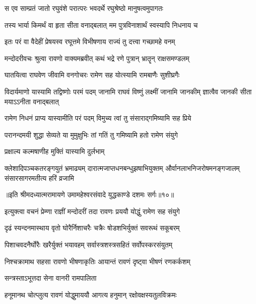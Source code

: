 \twolineshloka
{स एव साम्प्रतं जातो रघुवंशे परात्परः}
{भवदर्थे रघुश्रेष्ठो मानुषत्वमुपागतः} %

\twolineshloka
{तस्य भार्या किमर्थं वा हृता सीता वनाद्बलात्}
{मम पुत्रविनाशार्थं स्वस्यापि निधनाय च} %

\twolineshloka
{इतः परं वा वैदेहीं प्रेषयस्व रघूत्तमे}
{विभीषणाय राज्यं तु दत्त्वा गच्छामहे वनम्} %

\twolineshloka
{मन्दोदरीवचः श्रुत्वा रावणो वाक्यमब्रवीत्}
{कथं भद्रे रणे पुत्रान् भ्रातॄन् राक्षसमण्डलम्} %

\twolineshloka
{घातयित्वा राघवेण जीवामि वनगोचरः}
{रामेण सह योत्स्यामि रामबाणैः सुशीघ्रगैः} %

\threelineshloka
{विदार्यमाणो यास्यामि तद्विष्णोः परमं पदम्}
{जानामि राघवं विष्णुं लक्ष्मीं जानामि जानकीम्}
{ज्ञात्वैव जानकी सीता मयाऽऽनीता वनाद्बलात्} %

\twolineshloka
{रामेण निधनं प्राप्य यास्यामीति परं पदम्}
{विमुच्य त्वां तु संसाराद्गमिष्यामि सह प्रिये} %

\twolineshloka
{परानन्दमयी शुद्धा सेव्यते या मुमुक्षुभिः}
{तां गतिं तु गमिष्यामि हतो रामेण संयुगे} %

\onelineshloka
{प्रक्षाल्य कल्मषाणीह मुक्तिं यास्यामि दुर्लभाम्} %

\fourlineindentedshloka
{क्लेशादिपञ्चकतरङ्गयुतं भ्रमाढ्यम्}
{दारात्मजाप्तधनबन्धुझषाभियुक्तम्}
{और्वानलाभनिजरोषमनङ्गजालम्}
{संसारसागरमतीत्य हरिं व्रजामि} %

{॥इति श्रीमदध्यात्मरामायणे उमामहेश्वरसंवादे युद्धकाण्डे दशमः
सर्गः॥१०॥
}





\twolineshloka
{इत्युक्त्वा वचनं प्रेम्णा राज्ञीं मन्दोदरीं तदा}
{रावणः प्रययौ योद्धुं रामेण सह संयुगे} %

\twolineshloka
{दृढं स्यन्दनमास्थाय वृतो घोरैर्निशाचरैः}
{चक्रैः षोडशभिर्युक्तं सवरूथं सकूबरम्} %

\twolineshloka
{पिशाचवदनैर्घोरैः खरैर्युक्तं भयावहम्}
{सर्वास्त्रशस्त्रसहितं सर्वोपस्करसंयुतम्} %

\twolineshloka
{निश्चक्रामाथ सहसा रावणो भीषणाकृतिः}
{आयान्तं रावणं दृष्ट्वा भीषणं रणकर्कशम्} %

{सन्त्रस्ताऽभूत्तदा सेना वानरी रामपालिता} %


\twolineshloka
{हनूमानथ चोत्प्लुत्य रावणं योद्धुमाययौ}
{आगत्य हनुमान् रक्षोवक्षस्यतुलविक्रमः} %

